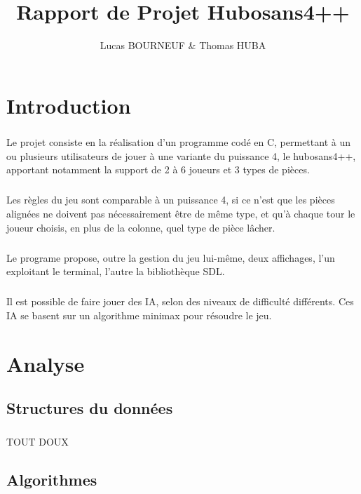 \documentclass{report}
\title{Rapport de Projet Hubosans4++}
\author{Lucas BOURNEUF \& Thomas HUBA}
\begin{document}
\maketitle


\chapter*{Introduction}
\paragraph*{}
Le projet consiste en la réalisation d'un programme codé en C, permettant à un ou plusieurs utilisateurs de jouer à une variante du puissance 4, le hubosans4++,
apportant notamment la support de 2 à 6 joueurs et 3 types de pièces. 
\paragraph*{}
Les règles du jeu sont comparable à un puissance 4, si ce n'est que les pièces alignées ne doivent pas nécessairement être de même type, et qu'à chaque tour le joueur choisis, en plus de la colonne, quel type de pièce lâcher.
\paragraph*{}
Le programe propose, outre la gestion du jeu lui-même, deux affichages, l'un exploitant le terminal, l'autre la bibliothèque SDL.
\paragraph*{}
Il est possible de faire jouer des IA, selon des niveaux de difficulté différents. Ces IA se basent sur un algorithme minimax pour résoudre le jeu.



\chapter*{Analyse}

\section*{Structures du données}
\paragraph*{}
TOUT DOUX

\section*{Algorithmes}
\end{document}

